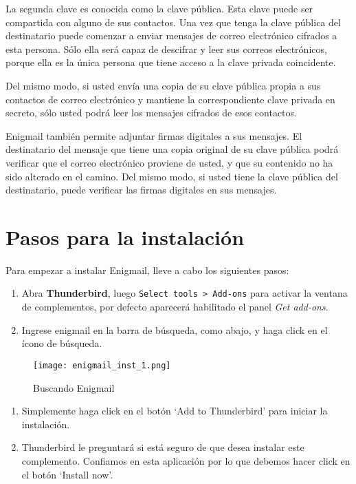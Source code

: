 \documentclass[10pt,a5paper,twoside,,]{book}
\begin{document}
La segunda clave es conocida como la clave pública. Esta clave puede ser
compartida con alguno de sus contactos. Una vez que tenga la clave
pública del destinatario puede comenzar a enviar mensajes de correo
electrónico cifrados a esta persona. Sólo ella será capaz de descifrar y
leer sus correos electrónicos, porque ella es la única persona que tiene
acceso a la clave privada coincidente.

Del mismo modo, si usted envía una copia de su clave pública propia a
sus contactos de correo electrónico y mantiene la correspondiente clave
privada en secreto, sólo usted podrá leer los mensajes cifrados de esos
contactos.

Enigmail también permite adjuntar firmas digitales a sus mensajes. El
destinatario del mensaje que tiene una copia original de su clave
pública podrá verificar que el correo electrónico proviene de usted, y
que su contenido no ha sido alterado en el camino. Del mismo modo, si
usted tiene la clave pública del destinatario, puede verificar las
firmas digitales en sus mensajes.

\section{Pasos para la instalación}\label{pasos-para-la-instalaciuxf3n}

Para empezar a instalar Enigmail, lleve a cabo los siguientes pasos:

\begin{enumerate}
\def\labelenumi{\arabic{enumi}.}
\item
  Abra \textbf{Thunderbird}, luego
  \texttt{Select\ tools\ \textgreater{}\ Add-ons} para activar la
  ventana de complementos, por defecto aparecerá habilitado el panel
  \emph{Get add-ons}.
\item
  Ingrese enigmail en la barra de búsqueda, como abajo, y haga click en
  el ícono de búsqueda.
\end{enumerate}

\begin{figure}[htbp]
\centering
\texttt{[image: enigmail\_inst\_1.png]}
\caption{Buscando Enigmail}
\end{figure}

\begin{enumerate}
\def\labelenumi{\arabic{enumi}.}
\setcounter{enumi}{2}
\item
  Simplemente haga click en el botón `Add to Thunderbird' para iniciar
  la instalación.
\item
  Thunderbird le preguntará si está seguro de que desea instalar este
  complemento. Confiamos en esta aplicación por lo que debemos hacer
  click en el botón `Install now'.
\end{enumerate}
\end{document}
